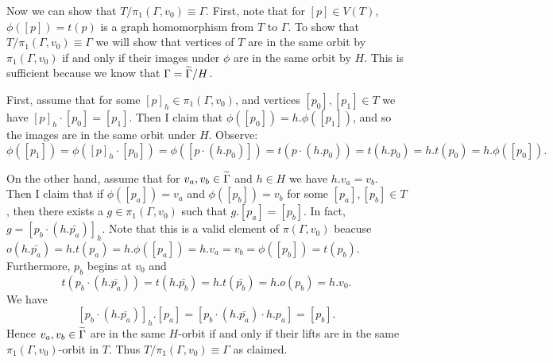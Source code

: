 Now we can show that $T/\pi_1(\Gamma, v_0) \equiv \Gamma$. First, note that for $[p] \in V(T)$, $\phi([p]) = t(p)$ is a graph homomorphism from $T$ to $\Gamma$. To show that $T/\pi_1(\Gamma, v_0) \equiv \Gamma$ we will show that vertices of $T$ are in the same orbit by $\pi_1(\Gamma, v_0)$ if and only if their images under $\phi$ are in the same orbit by $H$. This is sufficient because we know that $ \Gamma = \widetilde{\Gamma} / H$.

First, assume that for some $[p]_h \in \pi_1(\Gamma, v_0)$, and vertices $[p_0], [p_1] \in T$ we have $[p]_h \cdot [p_0] = [p_1]$. Then I claim that $\phi([p_0]) = h . \phi([p_1])$, and so the images are in the same orbit under $H$. Observe:
$$
    \phi([p_1]) = \phi([p]_h \cdot [p_0]) = \phi([p \cdot (h . p_0)]) = t(p \cdot (h . p_0)) = t(h . p_0) = h . t(p_0) = h.\phi([p_0]).
$$

On the other hand, assume that for $v_a, v_b \in \widetilde{\Gamma}$ and $h \in H$ we have $h . v_a = v_b$. Then I claim that if $\phi([p_a]) = v_a$ and $\phi([p_b]) = v_b$ for some $[p_a], [p_b] \in T$, then there exists a $g \in \pi_1(\Gamma, v_0)$ such that $g . [p_a] = [p_b]$. In fact, $g = [p_b \cdot (h . \bar {p_a})]_h$. Note that this is a valid element of $\pi(\Gamma, v_0)$ beacuse $o(h . \bar{p_a}) = h . t(p_a) = h . \phi([p_a]) = h . v_a = v_b = \phi([p_b]) = t(p_b)$. Furthermore, $p_b$ begins at $v_0$ and
$$
    t(p_b \cdot (h . \bar {p_a})) = t(h . \bar{p_b}) = h . t(\bar{p_b}) = h . o(p_b) = h . v_0.
$$
We have
$$
    [p_b \cdot (h . \bar {p_a})]_h . [p_a] = [p_b \cdot (h . \bar{p_a}) \cdot h . p_a] = [p_b].
$$
Hence $v_a, v_b \in \widetilde{\Gamma}$ are in the same $H$-orbit if and only if their lifts are in the same $\pi_1(\Gamma, v_0)$-orbit in $T$. Thus $T/\pi_1(\Gamma, v_0) \equiv \Gamma$ as claimed.
